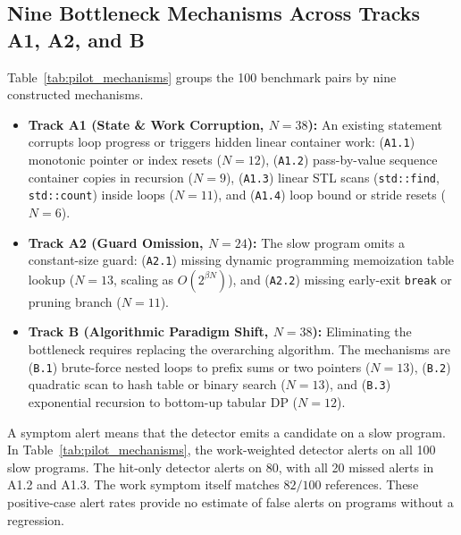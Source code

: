 \documentclass[10pt,conference]{IEEEtran}
\begin{document}
\subsection{Nine Bottleneck Mechanisms Across Tracks A1, A2, and B}
Table~\ref{tab:pilot_mechanisms} groups the 100 benchmark pairs by nine constructed mechanisms.
\begin{itemize}
    \item \textbf{Track A1 (State \& Work Corruption, $N=38$):} An existing statement corrupts loop progress or triggers hidden linear container work: (\texttt{A1.1}) monotonic pointer or index resets ($N=12$), (\texttt{A1.2}) pass-by-value sequence container copies in recursion ($N=9$), (\texttt{A1.3}) linear STL scans (\texttt{std::find}, \texttt{std::count}) inside loops ($N=11$), and (\texttt{A1.4}) loop bound or stride resets ($N=6$).
    \item \textbf{Track A2 (Guard Omission, $N=24$):} The slow program omits a constant-size guard: (\texttt{A2.1}) missing dynamic programming memoization table lookup ($N=13$, scaling as $O(2^{\beta N})$), and (\texttt{A2.2}) missing early-exit \texttt{break} or pruning branch ($N=11$).
    \item \textbf{Track B (Algorithmic Paradigm Shift, $N=38$):} Eliminating the bottleneck requires replacing the overarching algorithm. The mechanisms are (\texttt{B.1}) brute-force nested loops to prefix sums or two pointers ($N=13$), (\texttt{B.2}) quadratic scan to hash table or binary search ($N=13$), and (\texttt{B.3}) exponential recursion to bottom-up tabular DP ($N=12$).
\end{itemize}
A symptom alert means that the detector emits a candidate on a slow program. In Table~\ref{tab:pilot_mechanisms}, the work-weighted detector alerts on all 100 slow programs. The hit-only detector alerts on 80, with all 20 missed alerts in A1.2 and A1.3. The work symptom itself matches $82/100$ references. These positive-case alert rates provide no estimate of false alerts on programs without a regression.
\end{document}
